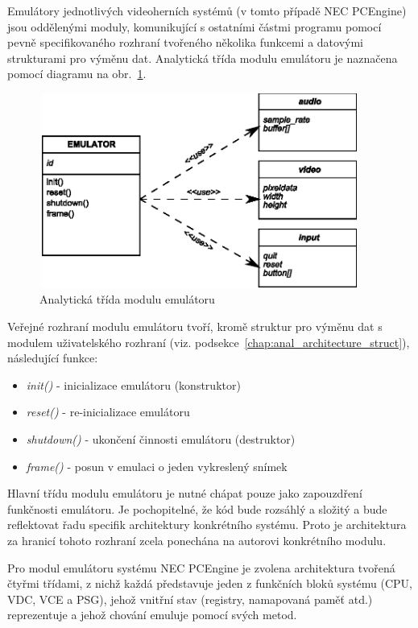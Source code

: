 Emulátory jednotlivých videoherních systémů (v tomto případě NEC PCEngine)
jsou oddělenými moduly, komunikující s ostatními částmi programu pomocí
pevně specifikovaného rozhraní tvořeného několika funkcemi a datovými
strukturami pro výměnu dat. Analytická třída modulu emulátoru je naznačena
pomocí diagramu na obr.~\ref{fig:anal_emu}.

\begin{figure}[ht]
\begin{center}
\includegraphics[width=10.5cm,height=6.4cm]{fig/anal_emu}
\caption{Analytická třída modulu emulátoru\label{fig:anal_emu}}
\end{center}
\end{figure}

Veřejné rozhraní modulu emulátoru tvoří, kromě struktur pro výměnu dat s
modulem uživatelského rozhraní (viz.
podsekce~\ref{chap:anal_architecture_struct}), následující funkce:
\begin{itemize}
\item {\it init()} - inicializace emulátoru (konstruktor)
\item {\it reset()} - re-inicializace emulátoru
\item {\it shutdown()} - ukončení činnosti emulátoru (destruktor)
\item {\it frame()} - posun v emulaci o jeden vykreslený snímek
\end{itemize}

Hlavní třídu modulu emulátoru je nutné chápat pouze jako zapouzdření funkčnosti
emulátoru. Je pochopitelné, že kód bude rozsáhlý a složitý a bude reflektovat
řadu specifik architektury konkrétního systému. Proto je architektura za
hranicí tohoto rozhraní zcela ponechána na autorovi konkrétního modulu.

Pro modul emulátoru systému NEC PCEngine je zvolena architektura tvořená čtyřmi
třídami, z nichž každá představuje jeden z funkčních bloků systému (CPU, VDC,
VCE a PSG), jehož vnitřní stav (registry, namapovaná paměť atd.) reprezentuje a
jehož chování emuluje pomocí svých metod.

